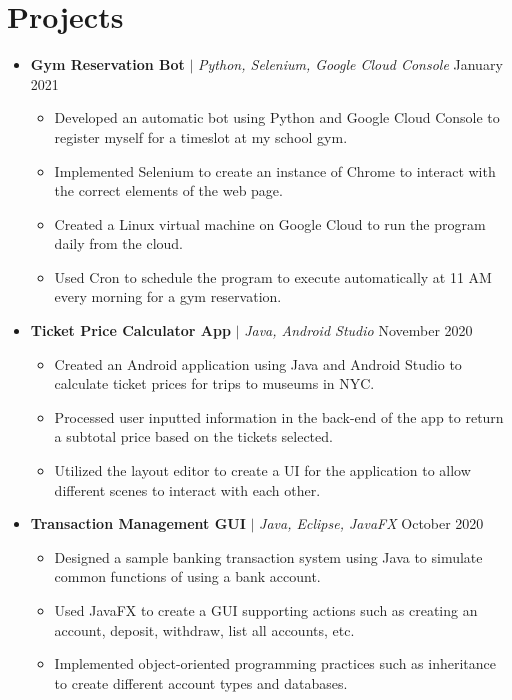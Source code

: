 \documentclass[letterpaper,5pt]{article}
\begin{document}
    
    \section{Projects}
    \begin{itemize}
        \item[]
            \textbf{Gym Reservation Bot} $|$ \emph{Python, Selenium, Google Cloud Console} \hfill January 2021
            \begin{itemize}
                \item[\textbullet] Developed an automatic bot using Python and Google Cloud Console to register myself for a timeslot at my school gym.
                \item[\textbullet] Implemented Selenium to create an instance of Chrome to interact with the correct elements of the web page.
                \item[\textbullet] Created a Linux virtual machine on Google Cloud to run the program daily from the cloud.
                \item[\textbullet] Used Cron to schedule the program to execute automatically at 11 AM every morning for a gym reservation.
            \end{itemize}
            \vspace{-13pt}
        \item[]
            \textbf{Ticket Price Calculator App} $|$ \emph{Java, Android Studio} \hfill November 2020
            \begin{itemize}
                \item[\textbullet] Created an Android application using Java and Android Studio to calculate ticket prices for trips to museums in NYC.
                \item[\textbullet] Processed user inputted information in the back-end of the app to return a subtotal price based on the tickets selected.
                \item[\textbullet] Utilized the layout editor to create a UI for the application to allow different scenes to interact with each other.
            \end{itemize}
            \vspace{-13pt}
        \item[]
            \textbf{Transaction Management GUI} $|$ \emph{Java, Eclipse, JavaFX} \hfill October 2020
            \begin{itemize}
                \item[\textbullet] Designed a sample banking transaction system using Java to simulate common functions of using a bank account.
                \item[\textbullet] Used JavaFX to create a GUI supporting actions such as creating an account, deposit, withdraw, list all accounts, etc.
                \item[\textbullet] Implemented object-oriented programming practices such as inheritance to create different account types and databases.
            \end{itemize}
    \end{itemize}
    \vspace{-15pt}
    
\end{document}
